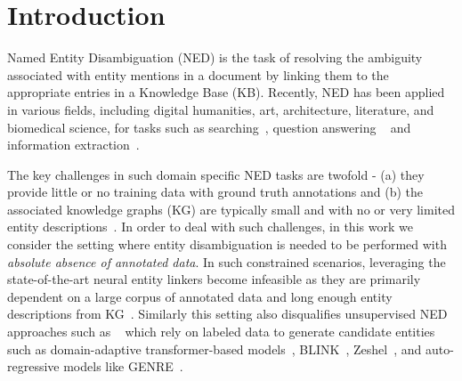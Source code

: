 \documentclass[11pt]{article}
\newcommand{\td}[1]{\textcolor{blue}{[{SP: #1}]}}
\begin{document}
\section{Introduction}
Named Entity Disambiguation (NED) is the task of resolving the ambiguity associated
with entity mentions in a document by linking them to the appropriate entries in a
Knowledge Base (KB).
Recently, NED has been applied in various fields, including digital humanities, art, architecture, literature, and biomedical science, for tasks such as searching~\cite{meij2014entity}, question answering
~\cite{yih-etal-2015-semantic} and information
extraction~\cite{nooralahzadeh-ovrelid-2018-sirius}.

The key challenges in such domain specific NED tasks are twofold - 
(a) they provide little or no training data with ground truth annotations and 
(b) the associated knowledge graphs (KG) are typically small and with no or very limited entity descriptions~\cite{shi2023knowledge}. In order to deal with such challenges, in this work we consider the setting where entity disambiguation is needed to be performed with \emph{absolute absence of annotated data}.
In such constrained scenarios, leveraging the state-of-the-art neural entity linkers become infeasible as they are primarily dependent on a 
large corpus of annotated data and long enough entity descriptions from KG~\cite{CadavidSnchez2023EvaluatingEE, arora2021low}.
Similarly this setting also disqualifies unsupervised NED approaches such as ~\cite{pan2015unsupervised} which rely on labeled data to generate candidate entities such as domain-adaptive transformer-based models~\cite{aydin-etal-2022-find}, BLINK~\cite{wu2019zero}, Zeshel~\cite{logeswaran-etal-2019-zero}, and auto-regressive models like GENRE~\cite{decao2021autoregressive}.
\end{document}
